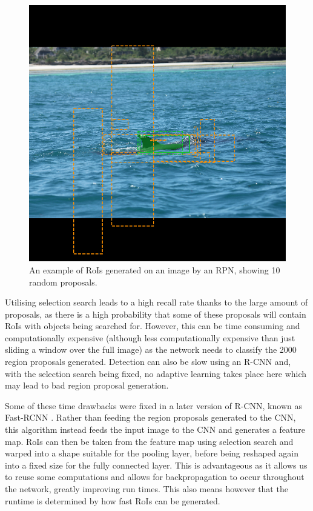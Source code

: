 \begin{figure}
	\begin{center}
		\includegraphics[scale=0.3]{Chapter2/figs/rpn-ten-random-orange.png}
	\end{center}
	\caption{An example of RoIs generated on an image by an RPN, showing 10 random proposals.}
	\label{fig:rpn-randoms}
\end{figure}

Utilising selection search leads to a high recall rate thanks to the large amount of proposals, as there is a high probability that some of these proposals will contain RoIs with objects being searched for. However, this can be time consuming and computationally expensive (although less computationally expensive than just sliding a window over the full image) as the network needs to classify the 2000 region proposals generated. Detection can also be slow using an R-CNN and, with the selection search being fixed, no adaptive learning takes place here which may lead to bad region proposal generation. 

Some of these time drawbacks were fixed in a later version of R-CNN, known as Fast-RCNN \cite{girshick_fast_2015}. Rather than feeding the region proposals generated to the CNN, this algorithm instead feeds the input image to the CNN and generates a feature map. RoIs can then be taken from the feature map using selection search and warped into a shape suitable for the pooling layer, before being reshaped again into a fixed size for the fully connected layer. This is advantageous as it allows us to reuse some computations and allows for backpropagation to occur throughout the network, greatly improving run times.  This also means however that the runtime is determined by how fast RoIs can be generated. 

